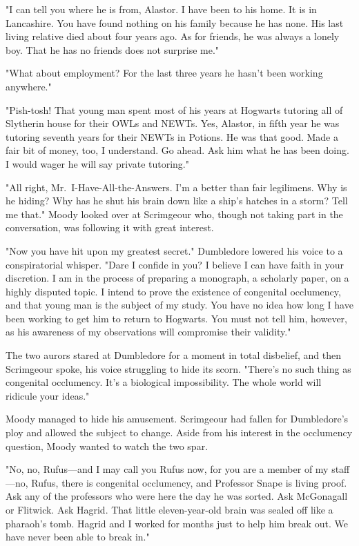 "I can tell you where he is from, Alastor. I have been to his home. It is in Lancashire. You have found nothing on his family because he has none. His last living relative died about four years ago. As for friends, he was always a lonely boy. That he has no friends does not surprise me."

"What about employment? For the last three years he hasn't been working anywhere."

"Pish-tosh! That young man spent most of his years at Hogwarts tutoring all of Slytherin house for their OWLs and NEWTs. Yes, Alastor, in fifth year he was tutoring seventh years for their NEWTs in Potions. He was that good. Made a fair bit of money, too, I understand. Go ahead. Ask him what he has been doing. I would wager he will say private tutoring."

"All right, Mr.~I-Have-All-the-Answers. I'm a better than fair legilimens. Why is he hiding? Why has he shut his brain down like a ship's hatches in a storm? Tell me that." Moody looked over at Scrimgeour who, though not taking part in the conversation, was following it with great interest.

"Now you have hit upon my greatest secret." Dumbledore lowered his voice to a conspiratorial whisper. "Dare I confide in you? I believe I can have faith in your discretion. I am in the process of preparing a monograph, a scholarly paper, on a highly disputed topic. I intend to prove the existence of congenital occlumency, and that young man is the subject of my study. You have no idea how long I have been working to get him to return to Hogwarts. You must not tell him, however, as his awareness of my observations will compromise their validity."

The two aurors stared at Dumbledore for a moment in total disbelief, and then Scrimgeour spoke, his voice struggling to hide its scorn. "There's no such thing as congenital occlumency. It's a biological impossibility. The whole world will ridicule your ideas."

Moody managed to hide his amusement. Scrimgeour had fallen for Dumbledore's ploy and allowed the subject to change. Aside from his interest in the occlumency question, Moody wanted to watch the two spar.

"No, no, Rufus—and I may call you Rufus now, for you are a member of my staff—no, Rufus, there is congenital occlumency, and Professor Snape is living proof. Ask any of the professors who were here the day he was sorted. Ask McGonagall or Flitwick. Ask Hagrid. That little eleven-year-old brain was sealed off like a pharaoh's tomb. Hagrid and I worked for months just to help him break out. We have never been able to break in."

